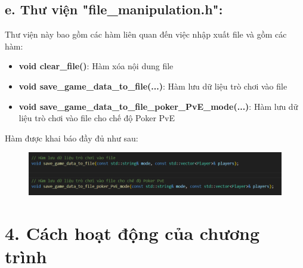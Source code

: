 \documentclass{article}
\begin{document}
\subsection{e. Thư viện "file\_manipulation.h": }
Thư viện này bao gồm các hàm liên quan đến việc nhập xuất file và gồm các hàm:
\begin{itemize}
    \item \textbf{void clear\_file()}: Hàm xóa nội dung file
    \item \textbf{void save\_game\_data\_to\_file(...)}: Hàm lưu dữ liệu trò chơi vào file
    \item \textbf{void save\_game\_data\_to\_file\_poker\_PvE\_mode(...)}: Hàm lưu dữ liệu trò chơi vào file cho chế độ Poker PvE
\end{itemize}
Hàm được khai báo đầy đủ như sau:
    \begin{figure}[h!]
        \centering
        \includegraphics[width=1\textwidth]{images/screenshot/3_e.png}
    \end{figure}

\vspace{3cm}
\section{4. Cách hoạt động của chương trình}
\end{document}
